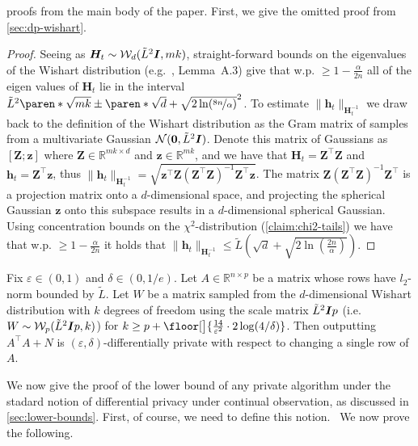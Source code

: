 \documentclass{article}
\renewcommand{\vec}[1]{\bm{#1}}
\newcommand{\Real}{\mathds{R}}
\DeclarePairedDelimiter{\paren}()
\DeclarePairedDelimiter{\floor}\lfloor\rfloor
\providecommand\transp{\top}
\let\transpsymbol\transp
\renewcommand{\transp}[1]{#1^\transpsymbol}
\newcommand{\Wishart}{\mathcal{W}}
\newcommand{\Normal}{\mathcal{N}}
\newcommand{\Eye}[1][]{\bm{I}\notblank{#1}{_{{#1}\times{#1}}}{}}
\newcommand{\XtX}[1]{\transp{#1}{#1}}
\begin{document}
proofs from the main body of the paper.  First, we give the omitted
proof from \cref{sec:dp-wishart}.

\PropWishartTails*
\begin{proof}
Seeing as $\vec H_t\sim\Wishart_d(\tilde L^2 \Eye, mk)$, straight-forward
bounds on the eigenvalues of the Wishart distribution
(e.g.~\cite{SheffetPrivateApproxRegression2015}, Lemma~A.3) give that
w.p. $\geq 1- \tfrac \alpha{2n}$ all of the eigen values of $\vec H_t$
lie in the interval $\tilde L^2 \paren*{\sqrt{mk} \pm \paren*{\sqrt{d}
    + \sqrt{2\ln(\nicefrac{8n}{\alpha})}}}^2$. To estimate $\|\vec
h_t\|_{\vec H_t^{-1}}$ we draw back to the definition of the Wishart
distribution as the Gram matrix of samples from a multivariate
Gaussian $\Normal(\vec 0, \tilde L^2\Eye)$. Denote this matrix of
Gaussians as $[\vec Z ; \vec z]$ where $\vec Z\in \Real^{mk\times d}$
and $\vec z \in \Real^{mk}$, and we have that $\vec H_t = \transp{\vec
  Z} \vec Z$ and $\vec h_t = \transp{\vec Z} \vec z$, thus $\|\vec
h_t\|_{\vec H_t^{-1}} = \sqrt{ \transp{\vec z} \vec Z (\transp{\vec  Z}
  \vec Z)^{-1}  \transp{\vec Z} \vec z }$. The matrix $\vec Z
(\transp{\vec Z} \vec Z)^{-1}  \transp{\vec Z}$ is a projection matrix
onto a $d$-dimensional space, and projecting the spherical Gaussian
$\vec z$ onto this subspace results in a $d$-dimensional spherical
Gaussian. Using concentration bounds on the $\chi^2$-distribution (\cref{claim:chi2-tails}) we have that w.p. $\geq 1- \tfrac \alpha{2n}$ it holds that $\|\vec h_t\|_{\vec H_t^{-1}}\leq \tilde L(\sqrt{d} + \sqrt{2\ln(\tfrac{2n}{\alpha})})$. %
\end{proof}

\begin{theorem}%
  \label{thm:wishart-dp}%
  Fix $\varepsilon\in(0,1)$ and $\delta\in(0,1/e)$.  Let
  $A\in\Real^{n\times p}$ be a matrix whose rows have $l_2$-norm
  bounded by $\tilde L$.  Let $W$ be a matrix sampled from the
  $d$-dimensional Wishart distribution with $k$ degrees of freedom
  using the scale matrix $\tilde L^2\Eye{p}$ (i.e.\
  $W \sim \Wishart_p(\tilde L^2\Eye{p}, k)$) for
  $k \ge p + \floor[\big]{\frac{14}{\varepsilon^2}\cdot 2\log(4/\delta)}$.
  Then outputting $\XtX{A} + N$ is
  $(\varepsilon,\delta)$-differentially private with respect to
  changing a single row of $A$.
\end{theorem}

We now give the proof of the lower bound of any private algorithm under the stadard notion of differential privacy under continual observation, as discussed in \cref{sec:lower-bounds}. First, of course, we need to define this notion. \DPDefinition
~We now prove the following.
\clmLinearRegretDP*
\DPLowerBoundProof
\end{document}
